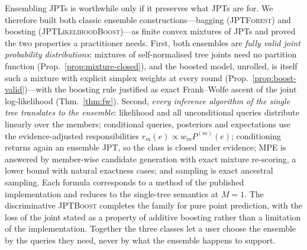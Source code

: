 \documentclass[11pt]{article}
\theoremstyle{plain}
\theoremstyle{definition}
\theoremstyle{remark}
\newcommand{\jptforest}{\textsc{JPTForest}}
\newcommand{\likeboost}{\textsc{JPTLikelihoodBoost}}
\newcommand{\jptboost}{\textsc{JPTBoost}}
\begin{document}
Ensembling JPTs is worthwhile only if it preserves what JPTs are for. We
therefore built both classic ensemble constructions---bagging
(\jptforest) and boosting (\likeboost)---as finite convex mixtures of
JPTs and proved the two properties a practitioner needs. First, both
ensembles are \emph{fully valid joint probability distributions}:
mixtures of self-normalised tree joints need no partition function
(Prop.~\ref{prop:mixture-closed}), and the boosted model, unrolled, is
itself such a mixture with explicit simplex weights at every round
(Prop.~\ref{prop:boost-valid})---with the boosting rule justified as
exact Frank--Wolfe ascent of the joint log-likelihood
(Thm.~\ref{thm:fw}). Second, \emph{every inference algorithm of the
single tree translates to the ensemble}: likelihood and all unconditional
queries distribute linearly over the members; conditional queries,
posteriors and expectations use the evidence-adjusted responsibilities
$r_m(e)\propto w_m P^{(m)}(e)$; conditioning returns again an ensemble
JPT, so the class is closed under evidence; MPE is answered by
member-wise candidate generation with exact mixture re-scoring, a lower
bound with natural exactness cases; and sampling is exact ancestral
sampling. Each formula corresponds to a method of the published
implementation and reduces to the single-tree semantics at $M=1$. The
discriminative \jptboost{} completes the family for pure point
prediction, with the loss of the joint stated as a property of additive
boosting rather than a limitation of the implementation. Together the
three classes let a user choose the ensemble by the queries they need,
never by what the ensemble happens to support.
\end{document}
